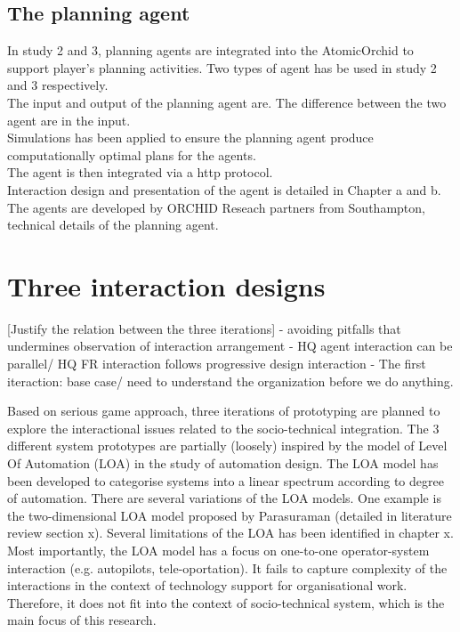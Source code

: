 \subsection{The planning agent}

In study 2 and 3, planning agents are integrated into the AtomicOrchid to support player's planning activities. Two types of agent has be used in study 2 and 3 respectively. \\

The input and output of the planning agent are. The difference between the two agent are in the input. \\

Simulations has been applied to ensure the planning agent produce computationally optimal plans for the agents.\\

The agent is then integrated via a http protocol. \\

Interaction design and presentation of the agent is detailed in Chapter a and b.\\

The agents are developed by ORCHID Reseach partners from Southampton, technical details of the planning agent.\\





\section{Three interaction designs}

[Justify the relation between the three iterations]
- avoiding pitfalls that undermines observation of interaction arrangement
- HQ agent interaction can be parallel/ HQ FR interaction follows progressive design interaction
- The first iteraction: base case/ need to understand the organization before we do anything.

Based on serious game approach, three iterations of prototyping are planned to explore the interactional issues related to the socio-technical integration. The 3 different system prototypes are partially (loosely) inspired by the model of Level Of Automation (LOA) in the study of automation design. The LOA model has been developed to categorise systems into a linear spectrum according to degree of automation. There are several variations of the LOA models. One example is the two-dimensional LOA model proposed by Parasuraman (detailed in literature review section x). Several limitations of the LOA has been identified in chapter x. Most importantly, the LOA model has a focus on one-to-one operator-system interaction (e.g. autopilots, tele-oportation). It fails to capture complexity of the interactions in the context of technology support for organisational work. Therefore, it does not fit into the context of socio-technical system, which is the main focus of this research. \\

